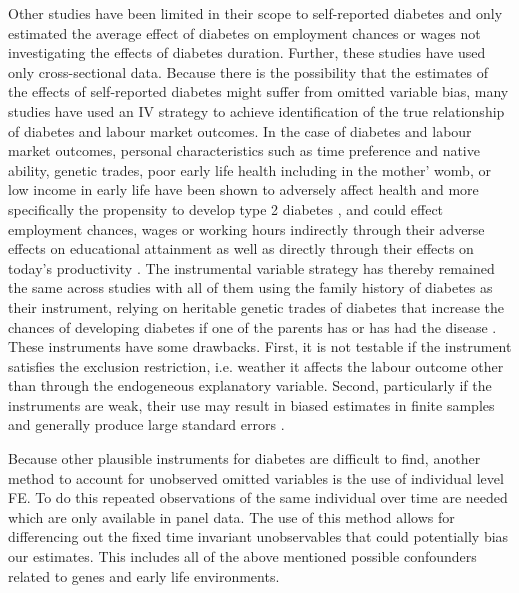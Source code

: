 Other studies have been limited in their scope to self-reported diabetes
and only estimated the average effect of diabetes on employment chances
or wages not investigating the effects of diabetes duration. Further,
these studies have used only cross-sectional data. Because there is
the possibility that the estimates of the effects of self-reported
diabetes might suffer from omitted variable bias, many studies have
used an \ac{IV} strategy to achieve identification of the true relationship
of diabetes and labour market outcomes. In the case of diabetes and
labour market outcomes, personal characteristics such as time preference
and native ability, genetic trades, poor early life health including
in the mother' womb, or low income in early life have been shown to
adversely affect health and more specifically the propensity to develop
type 2 diabetes \citep{VanEwijk2011a,Sotomayor2013,Li2010b}, and
could effect employment chances, wages or working hours indirectly
through their adverse effects on educational attainment \citep{Ayyagari2011b}
as well as directly through their effects on today's productivity
\citep{Currie2013}. The instrumental variable strategy has thereby
remained the same across studies with all of them using the family
history of diabetes as their instrument, relying on heritable genetic
trades of diabetes that increase the chances of developing diabetes
if one of the parents has or has had the disease \citep{Brown2005,Latif2009,Minor2010a,Lin2011b,Seuring2015}.
These instruments have some drawbacks. First, it
is not testable if the instrument satisfies the exclusion restriction, i.e. weather it affects the labour outcome other than through the endogeneous explanatory variable. Second, particularly if the instruments are weak, their use may result in biased estimates in finite samples and generally produce
large standard errors \citep{Bound1995}. 

Because other plausible instruments for diabetes are difficult to
find, another method to account for unobserved omitted variables is
the use of individual level \ac{FE}. To do this repeated observations
of the same individual over time are needed which are only available
in panel data. The use of this method allows for differencing out
the fixed time invariant unobservables that could potentially bias
our estimates. This includes all of the above mentioned possible confounders
related to genes and early life environments.

